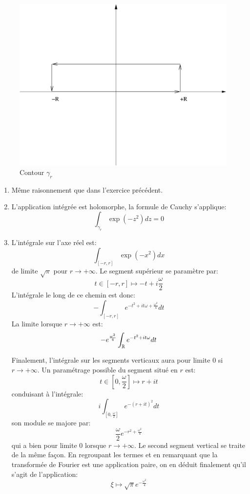 \documentclass[a4paper, 12pt]{amsart}
\begin{document}
 \begin{figure}[ht]
\includegraphics[scale=0.3]{contour_gauss.pdf}
\caption{Contour $\gamma_r$}\label{fig:contour3}
\end{figure}
\begin{enumerate}
 \item Même raisonnement que dans l'exercice précédent.
\item L'application intégrée est holomorphe, la formule de Cauchy s'applique:
\[
  \int_{\gamma_r} \exp(-z^2)dz = 0
  \]
\item L'intégrale sur l'axe réel est:
\[
 \int_{[-r,r]} \exp(-x^2) dx 
\]
de limite $\sqrt{\pi}$ pour $r \to +\infty$. Le segment supérieur se paramètre
par:
\[
 t \in [-r,r] \mapsto -t+i \frac{\omega}{2}
\]
L'intégrale le long de ce chemin est donc:
\[
 - \int_{[-r,r]} e^{-t^2 + i t \omega + \frac{\omega^2}{4}} dt
\]
La limite lorsque $r\to +\infty$ est:
\[
- e^{\frac{\omega^2}{4}} \int_{\mathbb{R}}  e^{-t^2 + i t \omega} dt 
\]

Finalement, l'intégrale sur les segments verticaux aura pour limite $0$ si $r
\to +\infty$. Un paramétrage possible du segment situé en $r$ est:
\[
t \in [0, \frac{\omega}{2}] \mapsto r + it 
\]
conduisant à l'intégrale:
\[
 i \int_{[0, \frac{\omega}{2}]} e^{-(r+it)^2} dt 
\]
son module se majore par:
\[
 \frac{\omega}{2}e^{-r^2 + \frac{\omega^2}{4}}
\]
qui a bien pour limite $0$ lorsque $r \to +\infty$. Le second segment vertical
se traite de la même façon. En regroupant les termes et en remarquant que la
transformée de Fourier est une application paire, on en déduit finalement
qu'il s'agit de l'application:
\[
 \xi \mapsto \sqrt{\pi} e^{-\frac{\omega^2}{4}}
\]
\end{enumerate}
\end{document}
